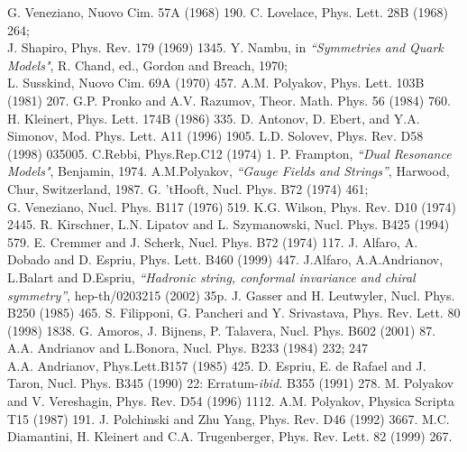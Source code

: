 \documentclass[a4paper,12pt]{article}
\begin{document}
\begin{thebibliography}{99}
 G. Veneziano, Nuovo Cim. 57A (1968) 190.
 C. Lovelace, Phys. Lett. 28B (1968) 264;\\
J. Shapiro, Phys. Rev. 179 (1969) 1345.
 Y. Nambu, in {\it ``Symmetries and Quark Models"},
R. Chand, ed., Gordon and Breach, 1970;\\ 
L. Susskind, Nuovo Cim. 69A (1970) 457.
 A.M. Polyakov, Phys. Lett. 103B (1981) 207.
 G.P. Pronko and A.V. Razumov, Theor. Math. Phys. 56 
(1984) 760.
 H. Kleinert,
Phys. Lett. 174B (1986) 335.
 D. Antonov, D. Ebert, and Y.A. Simonov, 
Mod. Phys. Lett. A11 (1996) 1905.
 L.D. Solovev, Phys. Rev. D58 (1998) 035005.
 C.Rebbi,
Phys.Rep.C12 (1974) 1.
 P. Frampton, {\it ``Dual Resonance
Models"}, Benjamin, 1974.
 A.M.Polyakov,  {\it ``Gauge Fields and Strings''}, Harwood,
Chur, Switzerland, 1987.
 G. 'tHooft, Nucl. Phys. B72 (1974) 461; \\
G. Veneziano, Nucl. Phys. B117 (1976) 519.
 K.G. Wilson, Phys. Rev. D10 (1974) 2445.
 R. Kirschner, L.N. Lipatov and L. Szymanowski, 
Nucl. Phys. B425 (1994) 579.
 E. Cremmer and J. Scherk, Nucl. Phys. B72 (1974) 117.
 J. Alfaro, A. Dobado and D. Espriu,
 Phys. Lett. B460 (1999) 447.
 J.Alfaro, A.A.Andrianov, L.Balart and D.Espriu,
{\it ``Hadronic string, conformal invariance and chiral symmetry''},
hep-th/0203215 (2002) 35p.
 J. Gasser and H. Leutwyler, Nucl. Phys. B250 (1985) 465.
 S.  Filipponi, G. Pancheri and  Y. Srivastava,
Phys. Rev. Lett. 80 (1998) 1838.
 G. Amoros, J. Bijnens, P. Talavera,
Nucl. Phys. B602 (2001) 87. 
 A.A. Andrianov and L.Bonora, Nucl. Phys. B233 (1984) 232; 247\\
 A.A. Andrianov, Phys.Lett.B157 (1985) 425. 
D. Espriu, E. de Rafael and J. Taron, Nucl. Phys. B345 (1990) 22:
 Erratum-{\it ibid.} B355 (1991) 278.
 M. Polyakov and V. Vereshagin, Phys. Rev. D54 (1996) 1112.
 A.M. Polyakov, Physica Scripta T15 (1987) 191.
J. Polchinski and Zhu Yang, Phys. Rev. D46 (1992) 3667.
M.C. Diamantini, H. Kleinert and C.A. Trugenberger, Phys. Rev.
Lett. 82 (1999) 267.
\end{thebibliography}
\end{document}

